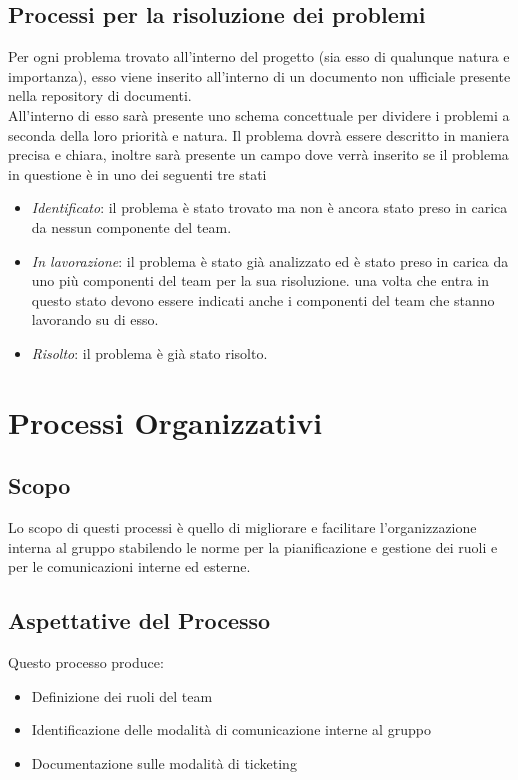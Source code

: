 \subsection{Processi per la risoluzione dei problemi}
Per ogni problema trovato all'interno del progetto (sia esso di qualunque natura e importanza), esso viene inserito all'interno di un documento non ufficiale presente nella repository di documenti. \\
All'interno di esso sarà presente uno schema concettuale per dividere i problemi a seconda della loro priorità e natura. Il problema dovrà essere descritto in maniera precisa e chiara, inoltre sarà presente un campo dove verrà inserito se il problema in questione è in uno dei seguenti tre stati
\begin{itemize}
	\item \textit{Identificato}: il problema è stato trovato ma non è ancora stato preso in carica da nessun componente del team.
	\item\textit{In lavorazione}: il problema è stato già analizzato ed è stato preso in carica da uno più componenti del team per la sua risoluzione. una volta che entra in questo stato devono essere indicati anche i componenti del team che stanno lavorando su di esso.
	\item \textit{Risolto}: il problema è già stato risolto.
\end{itemize}

\section{Processi Organizzativi}

\subsection{Scopo}
Lo scopo di questi processi è quello di migliorare e facilitare l’organizzazione interna al gruppo stabilendo le norme per la pianificazione e gestione dei ruoli e per le comunicazioni interne ed esterne.
\subsection{Aspettative del Processo}
Questo processo produce:
\begin{itemize}
	\item Definizione dei ruoli del team
	\item Identificazione delle modalità di comunicazione interne al gruppo
	\item Documentazione sulle modalità di ticketing
\end{itemize}

